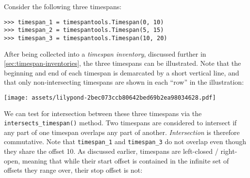 Consider the following three timespans:

\begin{comment}
<abjad>
timespan_1 = timespantools.Timespan(0, 10)
timespan_2 = timespantools.Timespan(5, 15)
timespan_3 = timespantools.Timespan(10, 20)
</abjad>
\end{comment}

\begin{singlespacing}
\vspace{-0.5\baselineskip}
\begin{lstlisting}
>>> timespan_1 = timespantools.Timespan(0, 10)
>>> timespan_2 = timespantools.Timespan(5, 15)
>>> timespan_3 = timespantools.Timespan(10, 20)
\end{lstlisting}
\end{singlespacing}

\noindent After being collected into a \emph{timespan inventory}, discussed
further in \autoref{sec:timespan-inventories}, the three timespans can be
illustrated. Note that the beginning and end of each timespan is demarcated by
a short vertical line, and that only non-intersecting timespans are shown in
each \enquote{row} in the illustration:

\begin{comment}
<abjad>[hide=true]
timespan_inventory = timespantools.TimespanInventory([
    timespan_1,
    timespan_2,
    timespan_3,
    ])
show(timespan_inventory)
</abjad>
\end{comment}

\begin{singlespacing}
\vspace{-0.5\baselineskip}
\noindent\texttt{[image: assets/lilypond-2bec073ccb80642bed69b2ea98034628.pdf]}
\end{singlespacing}

\noindent We can test for intersection between these three timespans via the
\texttt{intersects\_timespan()} method. Two timespans are considered to
intersect if any part of one timespan overlaps any part of another.
\emph{Intersection} is therefore commutative. Note that \texttt{timespan\_1}
and \texttt{timespan\_3} do not overlap even though they share the offset 10.
As discussed earlier, timespans are left-closed / right-open, meaning that
while their start offset is contained in the infinite set of offsets they range
over, their stop offset is not:

\begin{comment}
<abjad>
timespan_1.intersects_timespan(timespan_2)
timespan_1.intersects_timespan(timespan_3)
timespan_2.intersects_timespan(timespan_1)
timespan_2.intersects_timespan(timespan_3)
timespan_3.intersects_timespan(timespan_1)
timespan_3.intersects_timespan(timespan_2)
</abjad>
\end{comment}

